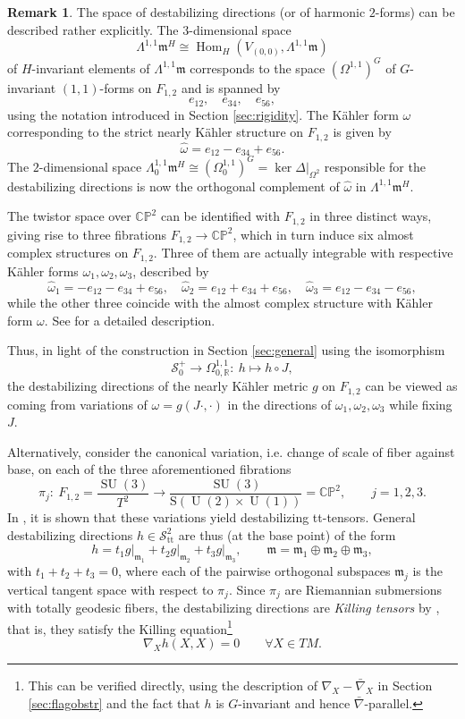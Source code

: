 \documentclass[12pt]{scrartcl}
\theoremstyle{plain}
\theoremstyle{definition}
\newtheorem{bem}[satz]{Remark}
\newcommand{\R}{\mathbb{R}}%
\newcommand{\CP}{\mathbb{CP}}%
\newcommand{\Hom}{\operatorname{Hom}}%
\renewcommand{\S}{\mathscr{S}}%
\newcommand{\U}{\operatorname{U}}%
\newcommand{\SU}{\operatorname{SU}}%
\newcommand{\m}{\mathfrak{m}}%
\newcommand{\TT}{\S^2_{\mathrm{tt}}}%
\begin{document}
\begin{bem}\label{flagcs}
The space of destabilizing directions (or of harmonic $2$-forms) can be described rather explicitly. The $3$-dimensional space
\[\Lambda^{1,1}\m^H\cong\Hom_H(V_{(0,0)},\Lambda^{1,1}\m)\]
of $H$-invariant elements of $\Lambda^{1,1}\m$ corresponds to the space $(\Omega^{1,1})^G$ of $G$-invariant $(1,1)$-forms on $F_{1,2}$ and is spanned by
\[e_{12},\quad e_{34},\quad e_{56},\]
using the notation introduced in Section \ref{sec:rigidity}. The Kähler form $\omega$ corresponding to the strict nearly Kähler structure on $F_{1,2}$ is given by
\[\hat\omega=e_{12}-e_{34}+e_{56}.\]
The $2$-dimensional space $\Lambda^{1,1}_0\m^H\cong(\Omega^{1,1}_0)^G=\ker\Delta\big|_{\Omega^2}$ responsible for the destabilizing directions is now the orthogonal complement of $\hat\omega$ in $\Lambda^{1,1}\m^H$.

The twistor space over $\CP^2$ can be identified with $F_{1,2}$ in three distinct ways, giving rise to three fibrations $F_{1,2}\to\CP^2$, which in turn induce six almost complex structures on $F_{1,2}$. Three of them are actually integrable with respective Kähler forms $\omega_1,\omega_2,\omega_3$, described by
\[\hat\omega_1=-e_{12}-e_{34}+e_{56},\quad\hat\omega_2=e_{12}+e_{34}+e_{56},\quad\hat\omega_3=e_{12}-e_{34}-e_{56},\]
while the other three coincide with the almost complex structure with Kähler form $\omega$. See \cite[Sec.~3.2.3]{morris} for a detailed description.

Thus, in light of the construction in Section \ref{sec:general} using the isomorphism
\[\S^+_0\to\Omega^{1,1}_{0,\R}:\ h\mapsto h\circ J,\]
the destabilizing directions of the nearly Kähler metric $g$ on $F_{1,2}$ can be viewed as coming from variations of $\omega=g(J\cdot,\cdot)$ in the directions of $\omega_1,\omega_2,\omega_3$ while fixing $J$.

Alternatively, consider the canonical variation, i.e. change of scale of fiber against base, on each of the three aforementioned fibrations
\[\pi_j:\ F_{1,2}=\frac{\SU(3)}{T^2}\longrightarrow\frac{\SU(3)}{\mathrm{S}(\U(2)\times\U(1))}=\CP^2,\qquad j=1,2,3.\]
In \cite[Prop.~4.4]{WW}, it is shown that these variations yield destabilizing tt-tensors. General destabilizing directions $h\in\TT$ are thus (at the base point) of the form
\[h=t_1g\big|_{\m_1}+t_2g\big|_{\m_2}+t_3g\big|_{\m_3},\qquad\m=\m_1\oplus\m_2\oplus\m_3,\]
with $t_1+t_2+t_3=0$, where each of the pairwise orthogonal subspaces $\m_j$ is the vertical tangent space with respect to $\pi_j$. Since $\pi_j$ are Riemannian submersions with totally geodesic fibers, the destabilizing directions are \emph{Killing tensors} by \cite[Ex.~7.3]{killing}, that is, they satisfy the Killing equation\footnote{This can be verified directly, using the description of $\nabla_X-\bar\nabla_X$ in Section \ref{sec:flagobstr} and the fact that $h$ is $G$-invariant and hence $\bar\nabla$-parallel.}
\[\nabla_Xh(X,X)=0\qquad\forall X\in TM.\]
\end{bem}
\end{document}
